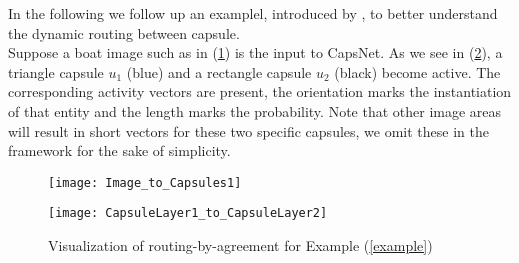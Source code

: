 \documentclass{article}
\begin{document}
{In the following we follow up an examplel, introduced by \cite{Image_to_Capsules1}, to better understand the dynamic routing between capsule.\\
Suppose a boat image such as in (\ref{Image_to_Capsules1}) is the input to CapsNet. As we see in (\ref{CapsuleLayer1_to_CapsuleLayer2}), a triangle capsule $u_1$ (blue) and a rectangle capsule $u_2$ (black) become active. The corresponding activity vectors are present, the orientation marks the instantiation of that entity and the length marks the probability. Note that other image areas will result in short vectors for these two specific capsules, we omit these in the framework for the sake of simplicity. 

\begin{figure}[!htb]
\vskip 0.2in
\begin{center}
\centerline{\texttt{[image: Image\_to\_Capsules1]}}
\caption{\cite{Image_to_Capsules1}\label{Image_to_Capsules1}}
\end{center}
\vskip -0.2in
\end{figure}

\begin{figure}[!htb]
\vskip 0.2in
\begin{center}
\centerline{\texttt{[image: CapsuleLayer1\_to\_CapsuleLayer2]}}
\caption{Visualization of routing-by-agreement for Example (\ref{example})   \cite{Image_to_Capsules1}\label{CapsuleLayer1_to_CapsuleLayer2}}
\end{center}
\vskip -0.2in
\end{figure}

}
\end{document}
